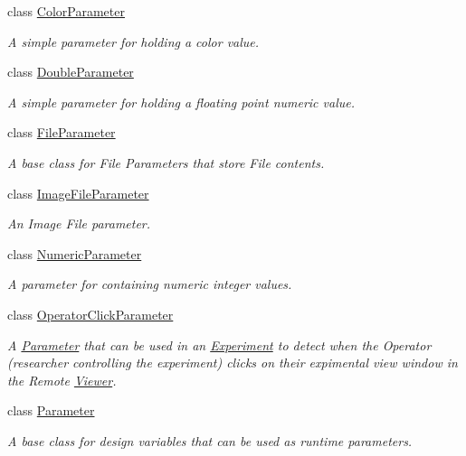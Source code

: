 \begin{DoxyCompactItemize}
class \hyperlink{class_picto_1_1_color_parameter}{Color\-Parameter}
\begin{DoxyCompactList}\small\item\em A simple parameter for holding a color value. \end{DoxyCompactList}\item 
class \hyperlink{class_picto_1_1_double_parameter}{Double\-Parameter}
\begin{DoxyCompactList}\small\item\em A simple parameter for holding a floating point numeric value. \end{DoxyCompactList}\item 
class \hyperlink{class_picto_1_1_file_parameter}{File\-Parameter}
\begin{DoxyCompactList}\small\item\em A base class for File Parameters that store File contents. \end{DoxyCompactList}\item 
class \hyperlink{class_picto_1_1_image_file_parameter}{Image\-File\-Parameter}
\begin{DoxyCompactList}\small\item\em An Image File parameter. \end{DoxyCompactList}\item 
class \hyperlink{class_picto_1_1_numeric_parameter}{Numeric\-Parameter}
\begin{DoxyCompactList}\small\item\em A parameter for containing numeric integer values. \end{DoxyCompactList}\item 
class \hyperlink{class_picto_1_1_operator_click_parameter}{Operator\-Click\-Parameter}
\begin{DoxyCompactList}\small\item\em A \hyperlink{class_picto_1_1_parameter}{Parameter} that can be used in an \hyperlink{class_picto_1_1_experiment}{Experiment} to detect when the Operator (researcher controlling the experiment) clicks on their expimental view window in the Remote \hyperlink{class_viewer}{Viewer}. \end{DoxyCompactList}\item 
class \hyperlink{class_picto_1_1_parameter}{Parameter}
\begin{DoxyCompactList}\small\item\em A base class for design variables that can be used as runtime parameters. \end{DoxyCompactList}\item 

\end{DoxyCompactItemize}
